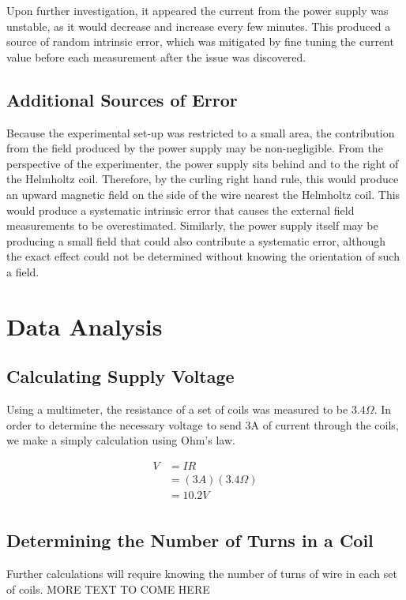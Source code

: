 \documentclass[a4paper]{article}
\begin{document}
Upon further investigation, it appeared the current from the power supply was unstable, as it would decrease and increase every few minutes. This produced a source of random intrinsic error, which was mitigated by fine tuning the current value before each measurement after the issue was discovered.

\subsection{Additional Sources of Error}

Because the experimental set-up was restricted to a small area, the contribution from the field produced by the power supply may be non-negligible. From the perspective of the experimenter, the power supply sits behind and to the right of the Helmholtz coil. Therefore, by the curling right hand rule, this would produce an upward magnetic field on the side of the wire nearest the Helmholtz coil. This would produce a systematic intrinsic error that causes the external field measurements to be overestimated. Similarly, the power supply itself may be producing a small field that could also contribute a systematic error, although the exact effect could not be determined without knowing the orientation of such a field.

\section{Data Analysis}


\subsection{Calculating Supply Voltage}
Using a multimeter, the resistance of a set of coils was measured to be $3.4 \Omega$. In order to determine the necessary voltage to send 3A of current through the coils, we make a simply calculation using Ohm's law.

\begin{align*}
V &= IR \\
  &= (3A)(3.4 \Omega) \\
  &= 10.2V \\
\end{align*}

\subsection{Determining the Number of Turns in a Coil}
Further calculations will require knowing the number of turns of wire in each set of coils. MORE TEXT TO COME HERE
\end{document}

